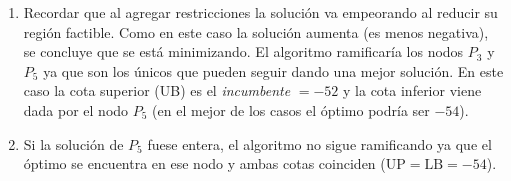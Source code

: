 \begin{enumerate}
  \item Recordar que al agregar restricciones la solución va empeorando al reducir su región factible. Como en este caso la solución aumenta (es menos negativa), se concluye que se está minimizando. El algoritmo ramificaría los nodos \(P_3\) y \(P_5\) ya que son los únicos que pueden seguir dando una mejor solución. En este caso la cota superior (UB) es el \emph{incumbente} \(=-52\) y la cota inferior viene dada por el nodo \(P_5\) (en el mejor de los casos el óptimo podría ser \(-54\)).
  \item Si la solución de \(P_5\) fuese entera, el algoritmo no sigue ramificando ya que el óptimo se encuentra en ese nodo y ambas cotas coinciden (\(\mathrm{UP} = \mathrm{LB} = -54\)).
\end{enumerate}
